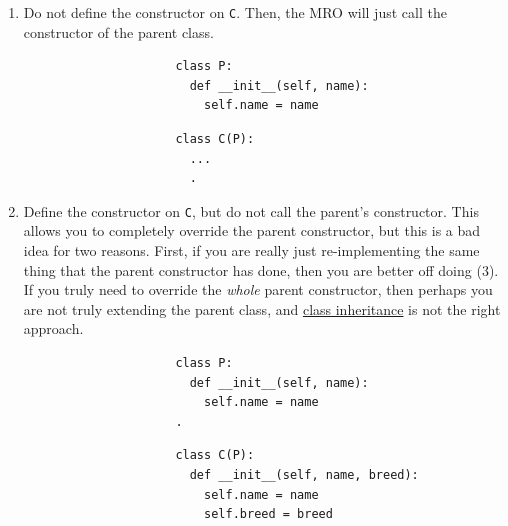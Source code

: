   \begin{enumerate}
    \item Do not define the constructor on \texttt{C}. Then, the MRO will just call the constructor of the parent class. 

    \begin{figure}[H]
      \centering
      \begin{subfigure}[b]{0.48\textwidth}
        \centering
        \begin{lstlisting}
          class P: 
            def __init__(self, name): 
              self.name = name
        \end{lstlisting}
        \caption{}
      \end{subfigure}
      \hfill 
      \begin{subfigure}[b]{0.48\textwidth}
        \centering
        \begin{lstlisting}
          class C(P): 
            ...
            .
        \end{lstlisting}
        \caption{}
      \end{subfigure}
      \caption{}
    \end{figure}

    \item Define the constructor on \texttt{C}, but do not call the parent's constructor. This allows you to completely override the parent constructor, but this is a bad idea for two reasons. First, if you are really just re-implementing the same thing that the parent constructor has done, then you are better off doing (3). If you truly need to override the \textit{whole} parent constructor, then perhaps you are not truly extending the parent class, and \hyperref[def:class-inheritance]{class inheritance} is not the right approach. 

    \begin{figure}[H]
      \centering
      \begin{subfigure}[b]{0.48\textwidth}
        \centering
        \begin{lstlisting}
          class P: 
            def __init__(self, name): 
              self.name = name
          .
        \end{lstlisting}
        \caption{}
      \end{subfigure}
      \hfill 
      \begin{subfigure}[b]{0.48\textwidth}
        \centering
        \begin{lstlisting}
          class C(P): 
            def __init__(self, name, breed): 
              self.name = name 
              self.breed = breed
        \end{lstlisting}
        \caption{}
      \end{subfigure}
      \caption{}
    \end{figure}


\end{enumerate}
